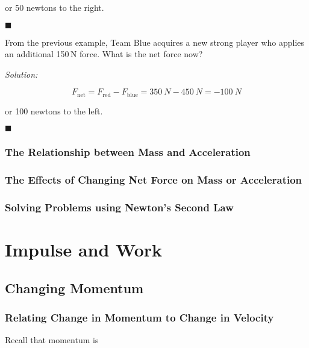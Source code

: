 \documentclass[dvipsnames]{article}
\newif\ifShowUnitIV                              %
\begin{document}
or 50 newtons to the right.

\hfill $\blacksquare$


\begin{example}
From the previous example, Team Blue acquires a new strong player who applies an additional 150\,N force. What is the net force now?
\end{example}

\textit{Solution:}

\begin{equation*}
    F_\mathrm{net} = F_\mathrm{red} - F_\mathrm{blue} = \SI{350}{N} - \SI{450}{N} = \boxed{-\SI{100}{N}}
\end{equation*}

or 100 newtons to the left.

\hfill $\blacksquare$

\subsubsection{The Relationship between Mass and Acceleration}

\subsubsection{The Effects of Changing Net Force on Mass or Acceleration}

\subsubsection{Solving Problems using Newton's Second Law}

\clearpage

\fi

\section{Impulse and Work}

\ifShowUnitIV
\setcounter{example}{0}

\subsection{Changing Momentum}

\subsubsection{Relating Change in Momentum to Change in Velocity}

Recall that momentum is
 
\end{document}
